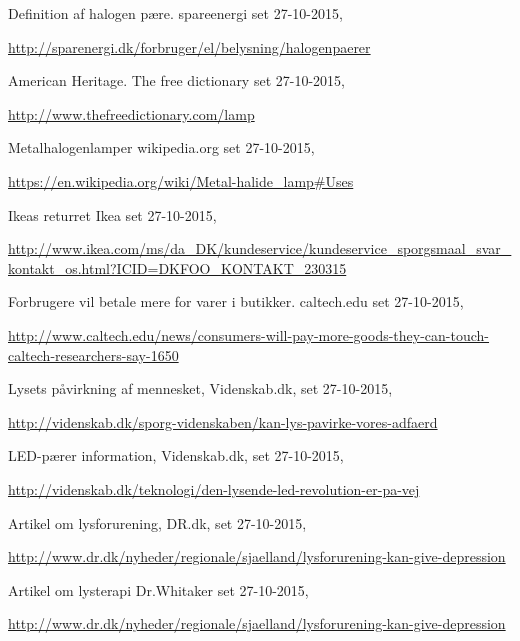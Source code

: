   Definition af halogen pære.
  spareenergi
  set 27-10-2015,
  
  \url{http://sparenergi.dk/forbruger/el/belysning/halogenpaerer}

  American Heritage.
  The free dictionary
  set 27-10-2015,
  
  \url{http://www.thefreedictionary.com/lamp}

  Metalhalogenlamper
  wikipedia.org
  set 27-10-2015,
  
  \url{https://en.wikipedia.org/wiki/Metal-halide_lamp#Uses}

  Ikeas returret
  Ikea
  set 27-10-2015,
  
  \url{http://www.ikea.com/ms/da_DK/kundeservice/kundeservice_sporgsmaal_svar_kontakt_os.html?ICID=DKFOO_KONTAKT_230315}


  Forbrugere vil betale mere for varer i butikker.
  caltech.edu
  set 27-10-2015,
  
  \url{http://www.caltech.edu/news/consumers-will-pay-more-goods-they-can-touch-caltech-researchers-say-1650}

  Lysets påvirkning af mennesket,
  Videnskab.dk,
  set 27-10-2015,
  
  \url{http://videnskab.dk/sporg-videnskaben/kan-lys-pavirke-vores-adfaerd}

  LED-pærer information,
  Videnskab.dk,
  set 27-10-2015,
  
  \url{http://videnskab.dk/teknologi/den-lysende-led-revolution-er-pa-vej}

  Artikel om lysforurening,
  DR.dk,
  set 27-10-2015,
  
  \url{http://www.dr.dk/nyheder/regionale/sjaelland/lysforurening-kan-give-depression}

  Artikel om lysterapi
  Dr.Whitaker
  set 27-10-2015,
  
  \url{http://www.dr.dk/nyheder/regionale/sjaelland/lysforurening-kan-give-depression}
  
